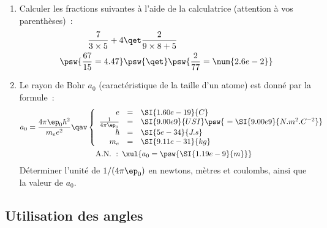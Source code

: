 \documentclass[../main/main.tex]{subfiles}
\begin{document}
\begin{enumerate}

	\item Calculer les fractions suivantes à l'aide de la calculatrice (attention
	      à vos parenthèses)~:
	      \begin{align*}
		      \frac{7}{3\times 5}+4
		       & \qet
		      \frac{2}{9\times8 + 5} \\
		      \psw{ \frac{67}{15} = 4.47 }
		       & \psw{ \qet }
		      \psw{ \frac{2}{77} = \num{2.6e-2} }
	      \end{align*}
	\item Le rayon de Bohr $a_0$ (caractéristique de la taille d'un atome) est
	      donné par la formule~:
	      \begin{gather*}
		      a_0 = \frac{4\pi \ep_0 \hbar^2}{m_ee^2}
		      \qav
		      \left\{
		      \begin{array}{rcl}
			      e                   & = & \SI{1.60e-19}{C}
			      \\
			      \frac{1}{4\pi\ep_0} & = & \SI{9.00e9}{USI} \psw{~
			      = \SI{9.00e9}{N.m^{2}.C^{-2}}
			      }
			      \\
			      \hbar               & = & \SI{5e-34}{J.s}
			      \\
			      m_e                 & = & \SI{9.11e-31}{kg}
		      \end{array}
		      \right.\\
		      \mathrm{A.N.~:}\enskip
		      \xul{a_0 = \psw{\SI{1.19e-9}{m}}
		      }
	      \end{gather*}
	      Déterminer l'unité de $1/(4\pi\ep_0)$ en newtons, mètres et
	      coulombs, ainsi que la valeur de $a_0$.
	      \vspace{-20pt}
\end{enumerate}

\subsection{Utilisation des angles}
\end{document}
